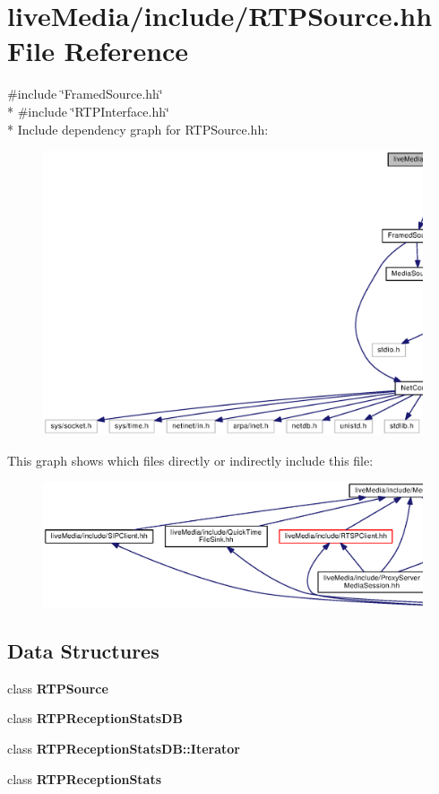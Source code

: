 \section{live\+Media/include/\+R\+T\+P\+Source.hh File Reference}
\label{RTPSource_8hh}
{\ttfamily \#include \char`\"{}Framed\+Source.\+hh\char`\"{}}\\*
{\ttfamily \#include \char`\"{}R\+T\+P\+Interface.\+hh\char`\"{}}\\*
Include dependency graph for R\+T\+P\+Source.\+hh\+:
\nopagebreak
\begin{figure}[H]
\begin{center}
\leavevmode
\includegraphics[width=350pt]{RTPSource_8hh__incl}
\end{center}
\end{figure}
This graph shows which files directly or indirectly include this file\+:
\nopagebreak
\begin{figure}[H]
\begin{center}
\leavevmode
\includegraphics[width=350pt]{RTPSource_8hh__dep__incl}
\end{center}
\end{figure}
\subsection*{Data Structures}
\begin{DoxyCompactItemize}
\item 
class {\bf R\+T\+P\+Source}
\item 
class {\bf R\+T\+P\+Reception\+Stats\+D\+B}
\item 
class {\bf R\+T\+P\+Reception\+Stats\+D\+B\+::\+Iterator}
\item 
class {\bf R\+T\+P\+Reception\+Stats}
\end{DoxyCompactItemize}
